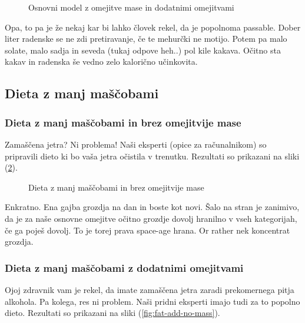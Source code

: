 \documentclass[a4paper]{article}
\begin{document}
\begin{figure}[H]
    \centering
    \caption{Osnovni model z omejitve mase in dodatnimi omejitvami}
    \label{fig:basic-add}
\end{figure}

Opa, to pa je že nekaj kar bi lahko človek rekel, da je popolnoma passable. Dober liter radenske se ne zdi
pretiravanje, če te mehurčki ne motijo. Potem pa malo solate, malo sadja in seveda (tukaj odpove heh..) pol kile 
kakava. Očitno sta kakav in radenska še vedno zelo kalorično učinkovita.

\newpage
\subsection{Dieta z manj maščobami}
\subsubsection{Dieta z manj maščobami in brez omejitvije mase}
Zamaščena jetra? Ni problema! Naši eksperti (opice za računalnikom) so pripravili dieto
ki bo vaša jetra očistila v trenutku. Rezultati so prikazani na sliki (\ref{fig:fat-no-mass}). \\

\begin{figure}[H]
    \centering
    \caption{Dieta z manj maščobami in brez omejitvije mase}
    \label{fig:fat-no-mass}
\end{figure}

Enkratno. Ena gajba grozdja na dan in boste kot novi. Šalo na stran je zanimivo, da je za naše
osnovne omejitve očitno grozdje dovolj hranilno v vseh kategorijah, če ga poješ dovolj. To je torej
prava space-age hrana. Or rather nek koncentrat grozdja. \\

\newpage
\subsubsection{Dieta z manj maščobami z dodatnimi omejitvami}
Ojoj zdravnik vam je rekel, da imate zamaščena jetra zaradi prekomernega pitja alkohola. Pa kolega, 
res ni problem. Naši pridni eksperti imajo tudi za to popolno dieto. Rezultati so prikazani na
sliki (\ref{fig:fat-add-no-mass}). \\
\end{document}
